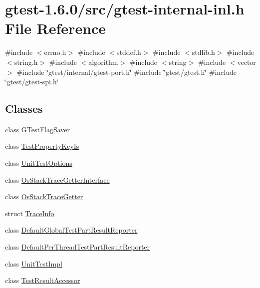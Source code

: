 \hypertarget{gtest-internal-inl_8h}{\section{gtest-\/1.6.0/src/gtest-\/internal-\/inl.h \-File \-Reference}
\label{d0/da1/gtest-internal-inl_8h}
}
{\ttfamily \#include $<$errno.\-h$>$}\*
{\ttfamily \#include $<$stddef.\-h$>$}\*
{\ttfamily \#include $<$stdlib.\-h$>$}\*
{\ttfamily \#include $<$string.\-h$>$}\*
{\ttfamily \#include $<$algorithm$>$}\*
{\ttfamily \#include $<$string$>$}\*
{\ttfamily \#include $<$vector$>$}\*
{\ttfamily \#include \char`\"{}gtest/internal/gtest-\/port.\-h\char`\"{}}\*
{\ttfamily \#include \char`\"{}gtest/gtest.\-h\char`\"{}}\*
{\ttfamily \#include \char`\"{}gtest/gtest-\/spi.\-h\char`\"{}}\*
\subsection*{\-Classes}
\begin{DoxyCompactItemize}
\item 
class \hyperlink{classtesting_1_1internal_1_1GTestFlagSaver}{\-G\-Test\-Flag\-Saver}
\item 
class \hyperlink{classtesting_1_1internal_1_1TestPropertyKeyIs}{\-Test\-Property\-Key\-Is}
\item 
class \hyperlink{classtesting_1_1internal_1_1UnitTestOptions}{\-Unit\-Test\-Options}
\item 
class \hyperlink{classtesting_1_1internal_1_1OsStackTraceGetterInterface}{\-Os\-Stack\-Trace\-Getter\-Interface}
\item 
class \hyperlink{classtesting_1_1internal_1_1OsStackTraceGetter}{\-Os\-Stack\-Trace\-Getter}
\item 
struct \hyperlink{structtesting_1_1internal_1_1TraceInfo}{\-Trace\-Info}
\item 
class \hyperlink{classtesting_1_1internal_1_1DefaultGlobalTestPartResultReporter}{\-Default\-Global\-Test\-Part\-Result\-Reporter}
\item 
class \hyperlink{classtesting_1_1internal_1_1DefaultPerThreadTestPartResultReporter}{\-Default\-Per\-Thread\-Test\-Part\-Result\-Reporter}
\item 
class \hyperlink{classtesting_1_1internal_1_1UnitTestImpl}{\-Unit\-Test\-Impl}
\item 
class \hyperlink{classtesting_1_1internal_1_1TestResultAccessor}{\-Test\-Result\-Accessor}
\end{DoxyCompactItemize}

